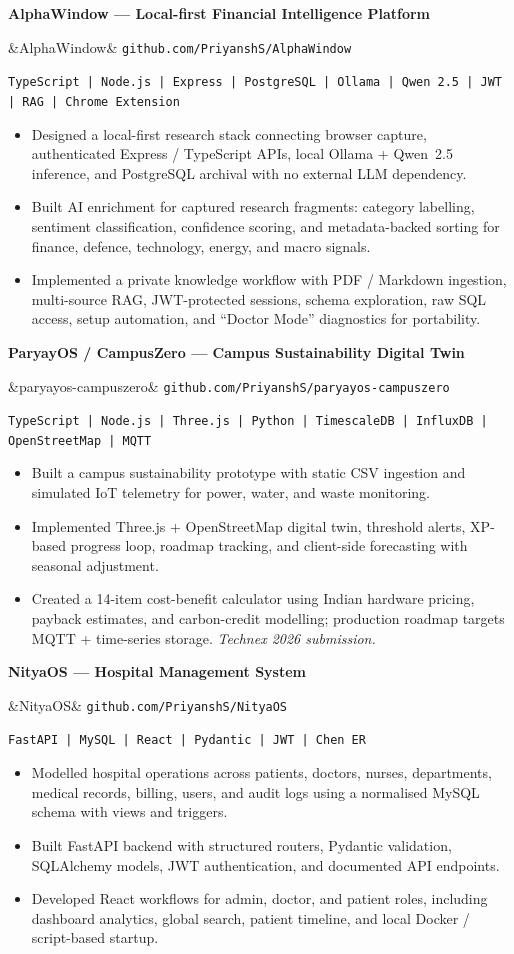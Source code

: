 \documentclass[10pt, a4paper]{article}
\newcommand{\rproject}[4]{%
  \noindent\textbf{#1}\par%
  \ifx&#2&\else
    \vspace{-1pt}%
    {\footnotesize\texttt{github.com/PriyanshS/#2}}\par%
  \fi
  \vspace{-1pt}%
  {\small\texttt{#3}}\par%
  \vspace{1pt}%
  #4%
  \vspace{3pt}%
  \noindent{\color{ruled}\rule{\linewidth}{0.3pt}}\par%
  \vspace{4pt}%
}
\begin{document}
\rproject{AlphaWindow --- Local-first Financial Intelligence Platform}
  {AlphaWindow}
  {TypeScript | Node.js | Express | PostgreSQL | Ollama | Qwen 2.5 | JWT | RAG | Chrome Extension}
  {\begin{itemize}
    \item Designed a local-first research stack connecting browser capture,
      authenticated Express / TypeScript APIs, local Ollama + Qwen~2.5 inference,
      and PostgreSQL archival with no external LLM dependency.
    \item Built AI enrichment for captured research fragments: category labelling,
      sentiment classification, confidence scoring, and metadata-backed sorting
      for finance, defence, technology, energy, and macro signals.
    \item Implemented a private knowledge workflow with PDF / Markdown ingestion,
      multi-source RAG, JWT-protected sessions, schema exploration, raw SQL access,
      setup automation, and ``Doctor Mode'' diagnostics for portability.
  \end{itemize}}

\rproject{ParyayOS / CampusZero --- Campus Sustainability Digital Twin}
  {paryayos-campuszero}
  {TypeScript | Node.js | Three.js | Python | TimescaleDB | InfluxDB | OpenStreetMap | MQTT}
  {\begin{itemize}
    \item Built a campus sustainability prototype with static CSV ingestion and
      simulated IoT telemetry for power, water, and waste monitoring.
    \item Implemented Three.js + OpenStreetMap digital twin, threshold alerts,
      XP-based progress loop, roadmap tracking, and client-side forecasting
      with seasonal adjustment.
    \item Created a 14-item cost-benefit calculator using Indian hardware pricing,
      payback estimates, and carbon-credit modelling; production roadmap targets
      MQTT + time-series storage. \textit{Technex 2026 submission.}
  \end{itemize}}

\rproject{NityaOS --- Hospital Management System}
  {NityaOS}
  {FastAPI | MySQL | React | Pydantic | JWT | Chen ER}
  {\begin{itemize}
    \item Modelled hospital operations across patients, doctors, nurses,
      departments, medical records, billing, users, and audit logs using
      a normalised MySQL schema with views and triggers.
    \item Built FastAPI backend with structured routers, Pydantic validation,
      SQLAlchemy models, JWT authentication, and documented API endpoints.
    \item Developed React workflows for admin, doctor, and patient roles,
      including dashboard analytics, global search, patient timeline, and
      local Docker / script-based startup.
  \end{itemize}}
\end{document}
